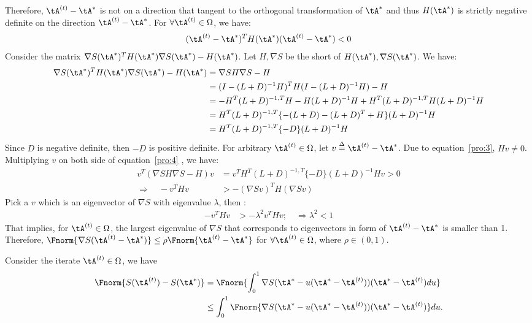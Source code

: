 \documentclass[11pt]{article}
\begin{document}
Therefore, $\tA^{(t)} - \tA^*$ is not on a direction that tangent to the orthogonal transformation of $\tA^*$ and thus $H(\tA^*)$ is strictly negative definite on the direction $\tA^{(t)} - \tA^*$.  For $\forall \tA^{(t)} \in \Omega$, we have:
\begin{align}
	(\tA^{(t)} - \tA^*)^T H(\tA^*) (\tA^{(t)} - \tA^*) < 0
\end{align}\label{pro:3}
Consider the matrix $ \nabla S(\tA^*)^T H(\tA^*) \nabla S(\tA^*) - H(\tA^*)$. Let $H ,\nabla S$ be the short of $H(\tA^*), \nabla S(\tA^*)$. We have:
\begin{align}
	 \nabla S(\tA^*)^T H(\tA^*) \nabla S(\tA^*) - H(\tA^*) &= \nabla S H \nabla S - H\notag \\
	&= (I - (L+D)^{-1}H)^T H (I - (L+D)^{-1}H) - H\notag\\
	& = - H^T(L+D)^{-1,T}H - H(L+D)^{-1} H + H^T(L+D)^{-1,T} H (L+D)^{-1} H\notag\\
	& = H^T(L+D)^{-1,T} \{-(L+D) - (L+D)^T + H \} (L+D) ^{-1} H\notag\\
	& = H^T(L+D)^{-1,T} \{- D \} (L+D) ^{-1} H\label{pro:4}
\end{align}
Since $D$ is negative definite, then $-D$ is positive definite. For arbitrary $\tA^{(t)} \in \Omega$, let $v \overset{\Delta}{=}  \tA^{(t)} - \tA^*$.  Due to equation~\ref{pro:3}, $H v \neq 0$. Multiplying $v$ on both side of equation~\ref{pro:4} , we have:
\begin{align*}
	v^T(\nabla S H \nabla S - H)v &= v^T H^T(L+D)^{-1,T} \{- D \} (L+D) ^{-1} Hv > 0 \\
	\Rightarrow \quad -v^T H v &> - (\nabla S v)^T H (\nabla S v)
\end{align*}
Pick a $v$ which is an eigenvector of $\nabla S$ with eigenvalue $\lambda$, then :
\begin{align*}
	-v^T H v &> - \lambda^2 v^T H  v; \quad \Rightarrow  \lambda^2 < 1
\end{align*}
That implies, for $\tA^{(t)} \in \Omega$, the largest eigenvalue of $\nabla S$ that corresponds to eigenvectors in form of $\tA^{(t)} - \tA^*$ is smaller than 1. Therefore, $\Fnorm{ \nabla S (\tA^{(t)} - \tA^*) } \leq \rho \Fnorm{\tA^{(t)} - \tA^* }$ for $\forall \tA^{(t)} \in \Omega$, where $\rho \in (0,1)$.

Consider the iterate $\tA^{(t)}\in \Omega$, we have
\begin{align}
	\Fnorm{S(\tA^{(t)})- S(\tA^*)} &= \Fnorm{ \int_{0}^1 \nabla S( \tA^{*} - u (\tA^* - \tA^{(t)})) (\tA^* - \tA^{(t)}) du}  \notag \\
    &\leq \int_{0}^1 \Fnorm{\nabla S( \tA^{*} - u (\tA^* - \tA^{(t)})) (\tA^* - \tA^{(t)})} du. \label{eq:int}
\end{align} 
\end{document}
